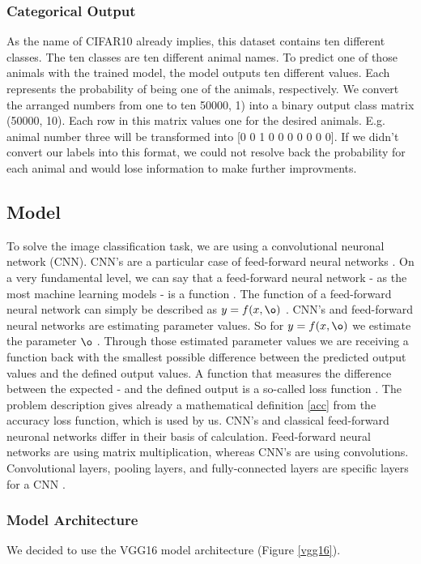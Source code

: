 \documentclass[journal]{IEEEtran}
\begin{document}
\subsubsection{Categorical Output}
\noindent As the name of CIFAR10 already implies, this dataset contains ten different classes. The ten classes are ten different animal names. To predict one of those animals with the trained model, the model outputs ten different values. Each represents the probability of being one of the animals, respectively. 
We convert the arranged numbers from one to ten 50000, 1) into a binary output class matrix (50000, 10). Each row in this matrix values one for the desired animals. E.g. animal number three will be transformed into [0 0 1 0 0 0 0 0 0 0].
If we didn't convert our labels into this format, we could not resolve back the probability for each animal and would lose information to make further improvments. \\

\subsection{Model}
\noindent To solve the image classification task, we are using a convolutional neuronal network (CNN). CNN's are a particular case of feed-forward neural networks \cite{Goodfellow-et-al-2016}. On a very fundamental level, we can say that a feed-forward neural network - as the most machine learning models - is a function \cite{RN5}. The function of a feed-forward neural network can simply be described as \(y = f(x, \o )\) . CNN's and feed-forward neural networks are estimating parameter values. So for \(y = f(x, \o )\) we estimate the parameter \(\o \) \cite{Goodfellow-et-al-2016}. Through those estimated parameter values we are receiving a function back with the smallest possible difference between the predicted output values and the defined output values. A function that measures the difference between the expected - and the defined output is a so-called loss function \cite{Goodfellow-et-al-2016}. The problem description gives already a mathematical definition \eqref{acc} from the accuracy loss function, which is used by us. 
CNN's and classical feed-forward neuronal networks differ in their basis of calculation. Feed-forward neural networks are using matrix multiplication, whereas CNN's are using convolutions. Convolutional layers, pooling layers, and fully-connected layers are specific layers for a CNN \cite{LeCun1998}. \\
\subsubsection{Model Architecture}
We decided to use the VGG16 model architecture \cite{RN15} (Figure \ref{vgg16}). 
\end{document}
